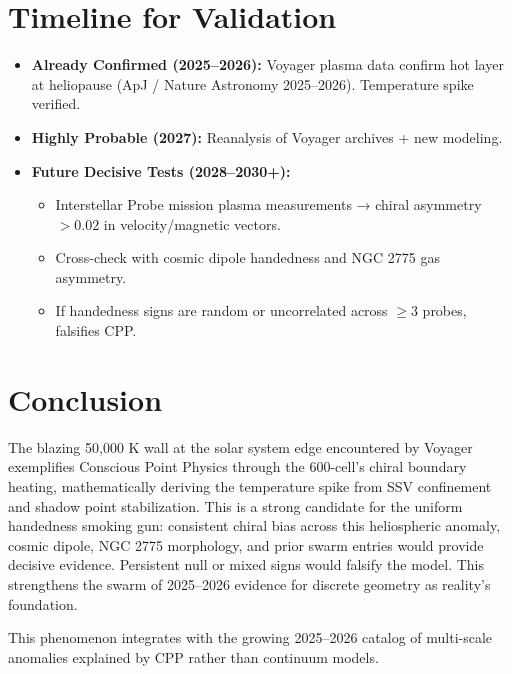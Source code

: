 \documentclass[11pt]{article}
\begin{document}
\section{Timeline for Validation}
\begin{itemize}
    \item \textbf{Already Confirmed (2025--2026):} Voyager plasma data confirm hot layer at heliopause (ApJ / Nature Astronomy 2025--2026). Temperature spike verified.
    \item \textbf{Highly Probable (2027):} Reanalysis of Voyager archives + new modeling.
    \item \textbf{Future Decisive Tests (2028--2030+):}
    \begin{itemize}
        \item Interstellar Probe mission plasma measurements → chiral asymmetry $>0.02$ in velocity/magnetic vectors.
        \item Cross-check with cosmic dipole handedness and NGC 2775 gas asymmetry.
        \item If handedness signs are random or uncorrelated across $\geq 3$ probes, falsifies CPP.
    \end{itemize}
\end{itemize}

\section{Conclusion}
The blazing 50,000 K wall at the solar system edge encountered by Voyager exemplifies Conscious Point Physics through the 600-cell's chiral boundary heating, mathematically deriving the temperature spike from SSV confinement and shadow point stabilization. This is a strong candidate for the uniform handedness smoking gun: consistent chiral bias across this heliospheric anomaly, cosmic dipole, NGC 2775 morphology, and prior swarm entries would provide decisive evidence. Persistent null or mixed signs would falsify the model. This strengthens the swarm of 2025--2026 evidence for discrete geometry as reality's foundation.

This phenomenon integrates with the growing 2025--2026 catalog of multi-scale anomalies explained by CPP rather than continuum models.
\end{document}

